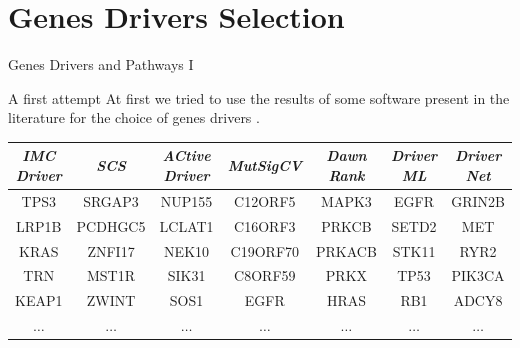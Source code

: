 \documentclass{beamer}
\begin{document}
\section{Genes Drivers Selection}
\begin{frame}{Genes Drivers and Pathways I}
  \begin{block}{A first attempt}
    At first we tried to use the results of some software present in the
    literature for the choice of genes drivers \cite{imcdriver}. 
  \end{block}
  \pause
  \begin{table}[H]
    \tiny
    \centering

    \begin{tabular}{|c|c|c|c|c|c|c|}
      \hline {\color{nordgreen}\textit{\textbf{IMC Driver}}} & \textit{SCS}
      & \textit{ACtive Driver} & {\color{nordgreen}\textit\textbf{{MutSigCV}}}
      & \textit{Dawn Rank} & \textit{Driver ML} & \textit{Driver Net} \\
      \hline
      \hline TPS3 & SRGAP3 & NUP155 & C12ORF5 & MAPK3 & EGFR & GRIN2B \\
      \hline LRP1B & PCDHGC5 & LCLAT1 & C16ORF3 & PRKCB & SETD2 & MET \\
      \hline KRAS & ZNFI17 & NEK10 & C19ORF70 & PRKACB & STK11 & RYR2 \\
      \hline TRN & MST1R & SIK31 & C8ORF59 & PRKX & TP53 & PIK3CA \\
      \hline KEAP1 & ZWINT & SOS1 & EGFR & HRAS & RB1 & ADCY8 \\
      \hline$\ldots$ & $\ldots$ & $\ldots$ & $\ldots$ & $\ldots$ & $\ldots$
                                                & $\ldots$ \\
      \hline
    \end{tabular}

  \end{table}
\end{frame}
\end{document}
